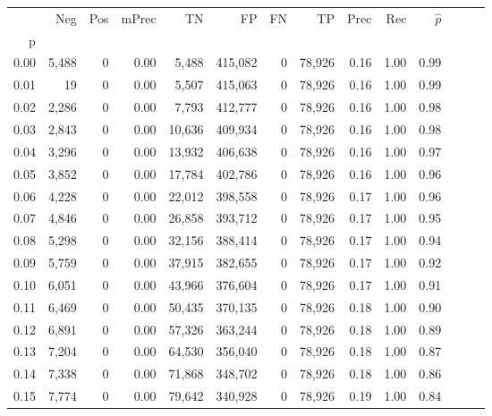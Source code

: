\begin{tabular}{rrrrrrrrrrrrrr}
\toprule
{} &    Neg &    Pos & mPrec &       TN &       FP &      FN &      TP &  Prec &   Rec & $\hat{p}$ \\
p    &        &        &       &          &          &         &         &       &       &           \\
\midrule
0.00 &  5,488 &      0 &  0.00 &    5,488 &  415,082 &       0 &  78,926 &  0.16 &  1.00 &      0.99 \\
0.01 &     19 &      0 &  0.00 &    5,507 &  415,063 &       0 &  78,926 &  0.16 &  1.00 &      0.99 \\
0.02 &  2,286 &      0 &  0.00 &    7,793 &  412,777 &       0 &  78,926 &  0.16 &  1.00 &      0.98 \\
0.03 &  2,843 &      0 &  0.00 &   10,636 &  409,934 &       0 &  78,926 &  0.16 &  1.00 &      0.98 \\
0.04 &  3,296 &      0 &  0.00 &   13,932 &  406,638 &       0 &  78,926 &  0.16 &  1.00 &      0.97 \\
0.05 &  3,852 &      0 &  0.00 &   17,784 &  402,786 &       0 &  78,926 &  0.16 &  1.00 &      0.96 \\
0.06 &  4,228 &      0 &  0.00 &   22,012 &  398,558 &       0 &  78,926 &  0.17 &  1.00 &      0.96 \\
0.07 &  4,846 &      0 &  0.00 &   26,858 &  393,712 &       0 &  78,926 &  0.17 &  1.00 &      0.95 \\
0.08 &  5,298 &      0 &  0.00 &   32,156 &  388,414 &       0 &  78,926 &  0.17 &  1.00 &      0.94 \\
0.09 &  5,759 &      0 &  0.00 &   37,915 &  382,655 &       0 &  78,926 &  0.17 &  1.00 &      0.92 \\
0.10 &  6,051 &      0 &  0.00 &   43,966 &  376,604 &       0 &  78,926 &  0.17 &  1.00 &      0.91 \\
0.11 &  6,469 &      0 &  0.00 &   50,435 &  370,135 &       0 &  78,926 &  0.18 &  1.00 &      0.90 \\
0.12 &  6,891 &      0 &  0.00 &   57,326 &  363,244 &       0 &  78,926 &  0.18 &  1.00 &      0.89 \\
0.13 &  7,204 &      0 &  0.00 &   64,530 &  356,040 &       0 &  78,926 &  0.18 &  1.00 &      0.87 \\
0.14 &  7,338 &      0 &  0.00 &   71,868 &  348,702 &       0 &  78,926 &  0.18 &  1.00 &      0.86 \\
0.15 &  7,774 &      0 &  0.00 &   79,642 &  340,928 &       0 &  78,926 &  0.19 &  1.00 &      0.84 \\

\end{tabular}
